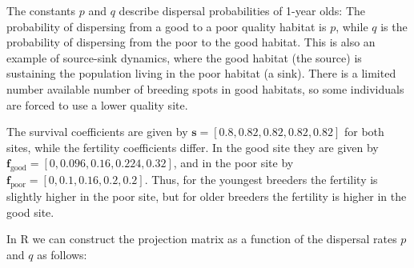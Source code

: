 \documentclass[
]{book}
\begin{document}
The constants \(p\) and \(q\) describe dispersal probabilities of 1-year olds: The probability of dispersing from a good to a poor quality habitat is \(p\), while \(q\) is the probability of dispersing from the poor to the good habitat. This is also an example of source-sink dynamics, where the good habitat (the source) is sustaining the population living in the poor habitat (a sink). There is a limited number available number of breeding spots in good habitats, so some individuals are forced to use a lower quality site.

The survival coefficients are given by \(\mathbf{s}=[0.8, 0.82, 0.82, 0.82, 0.82]\) for both sites, while the fertility coefficients differ. In the good site they are given by \(\mathbf{f}_\text{good}=[0, 0.096, 0.16, 0.224, 0.32]\), and in the poor site by \(\mathbf{f}_{\text{poor}}=[0, 0.1, 0.16, 0.2, 0.2]\). Thus, for the youngest breeders the fertility is slightly higher in the poor site, but for older breeders the fertility is higher in the good site.

In R we can construct the projection matrix as a function of the dispersal rates \(p\) and \(q\) as follows:
\end{document}
